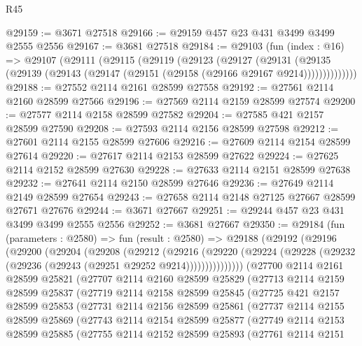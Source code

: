 \begin{lexlean}{R45}
\begin{coremodule}
@29159 := @3671 @27518
@29166 := @29159 @457 @23 @431 @3499 @3499 @2555 @2556
@29167 := @3681 @27518
@29184 := @29103
    (fun (index : @16) =>
    @29107
      (@29111
        (@29115
          (@29119
            (@29123
              (@29127
                (@29131
                  (@29135 (@29139 (@29143 (@29147 (@29151 (@29158 (@29166 @29167 @9214))))))))))))))
@29188 := @27552 @2114 @2161 @28599 @27558
@29192 := @27561 @2114 @2160 @28599 @27566
@29196 := @27569 @2114 @2159 @28599 @27574
@29200 := @27577 @2114 @2158 @28599 @27582
@29204 := @27585 @421 @2157 @28599 @27590
@29208 := @27593 @2114 @2156 @28599 @27598
@29212 := @27601 @2114 @2155 @28599 @27606
@29216 := @27609 @2114 @2154 @28599 @27614
@29220 := @27617 @2114 @2153 @28599 @27622
@29224 := @27625 @2114 @2152 @28599 @27630
@29228 := @27633 @2114 @2151 @28599 @27638
@29232 := @27641 @2114 @2150 @28599 @27646
@29236 := @27649 @2114 @2149 @28599 @27654
@29243 := @27658 @2114 @2148 @27125 @27667 @28599 @27671 @27676
@29244 := @3671 @27667
@29251 := @29244 @457 @23 @431 @3499 @3499 @2555 @2556
@29252 := @3681 @27667
@29350 := @29184
    (fun (parameters : @2580) =>
    fun (result : @2580) =>
    @29188
      (@29192
        (@29196
          (@29200
            (@29204
              (@29208
                (@29212
                  (@29216
                    (@29220
                      (@29224 (@29228 (@29232 (@29236 (@29243 (@29251 @29252 @9214)))))))))))))))
    (@27700
      @2114
      @2161
      @28599
      @25821
      (@27707
        @2114
        @2160
        @28599
        @25829
        (@27713
          @2114
          @2159
          @28599
          @25837
          (@27719
            @2114
            @2158
            @28599
            @25845
            (@27725
              @421
              @2157
              @28599
              @25853
              (@27731
                @2114
                @2156
                @28599
                @25861
                (@27737
                  @2114
                  @2155
                  @28599
                  @25869
                  (@27743
                    @2114
                    @2154
                    @28599
                    @25877
                    (@27749
                      @2114
                      @2153
                      @28599
                      @25885
                      (@27755
                        @2114
                        @2152
                        @28599
                        @25893
                        (@27761
                          @2114
                          @2151

\end{coremodule}
\end{lexlean}
